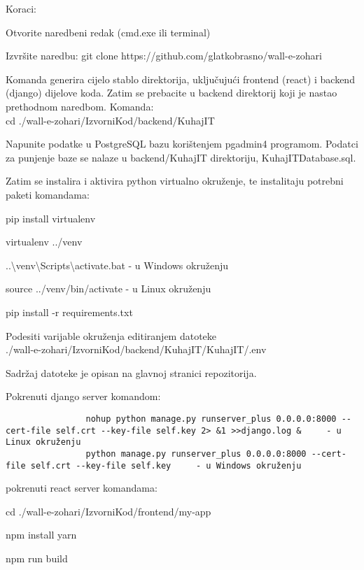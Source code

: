 			Koraci:
			\begin{packed_enum}
				\item Otvorite naredbeni redak (cmd.exe ili terminal)
				\item Izvršite naredbu: git clone https://github.com/glatkobrasno/wall-e-zohari
				\item Komanda generira cijelo stablo direktorija, uključujući frontend (react) i backend (django) dijelove koda.
				Zatim se prebacite u backend direktorij koji je nastao prethodnom naredbom. Komanda: \\ cd  ./wall-e-zohari/IzvorniKod/backend/KuhajIT
				\item Napunite podatke u PostgreSQL bazu korištenjem pgadmin4 programom. Podatci za punjenje baze se nalaze u backend/KuhajIT direktoriju, KuhajITDatabase.sql. 
				\item Zatim se instalira i aktivira python virtualno okruženje, te instalitaju potrebni paketi komandama:
				\item[] \begin{packed_enum}
				    \item pip install virtualenv
				    \item virtualenv ../venv
     				\item ..\textbackslash venv\textbackslash Scripts\textbackslash activate.bat - u Windows okruženju
      				\item source ../venv/bin/activate - u Linux okruženju

				    \item pip install -r requirements.txt	
				\end{packed_enum}
				\item Podesiti varijable okruženja editiranjem datoteke \\ ./wall-e-zohari/IzvorniKod/backend/KuhajIT/KuhajIT/.env
				\item Sadržaj datoteke je opisan na glavnoj stranici repozitorija.
			     \item Pokrenuti django server komandom: 
				\item[] \begin{verbatim}
				nohup python manage.py runserver_plus 0.0.0.0:8000 --cert-file self.crt --key-file self.key 2> &1 >>django.log &     - u Linux okruženju
				python manage.py runserver_plus 0.0.0.0:8000 --cert-file self.crt --key-file self.key     - u Windows okruženju
				\end{verbatim}
			     \item pokrenuti react server komandama:
			     \item[] \begin{packed_enum}
			     	\item cd ./wall-e-zohari/IzvorniKod/frontend/my-app
			     	\item npm install yarn
			     	\item npm run build
			     	

\end{packed_enum}
\end{packed_enum}
